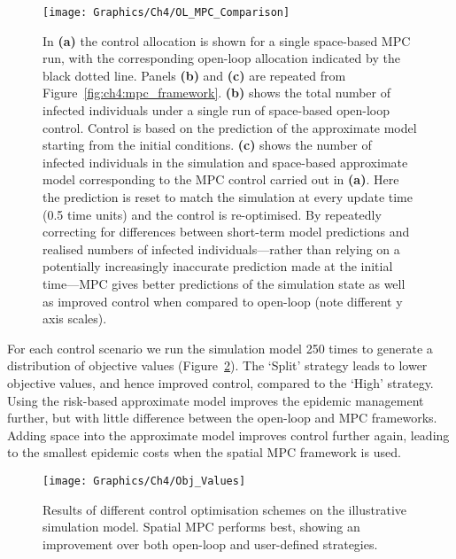 \begin{figure}[h]
    \begin{center}
        \texttt{[image: Graphics/Ch4/OL\_MPC\_Comparison]}
        \caption[Comparing open-loop and MPC optimal strategies]{In \textbf{(a)} the control allocation is shown for a single space-based MPC run, with the corresponding open-loop allocation indicated by the black dotted line. Panels \textbf{(b)} and \textbf{(c)} are repeated from Figure~\ref{fig:ch4:mpc_framework}. \textbf{(b)} shows the total number of infected individuals under a single run of space-based open-loop control. Control is based on the prediction of the approximate model starting from the initial conditions. \textbf{(c)} shows the number of infected individuals in the simulation and space-based approximate model corresponding to the MPC control carried out in \textbf{(a)}. Here the prediction is reset to match the simulation at every update time (0.5 time units) and the control is re-optimised. By repeatedly correcting for differences between short-term model predictions and realised numbers of infected individuals---rather than relying on a potentially increasingly inaccurate prediction made at the initial time---MPC gives better predictions of the simulation state as well as improved control when compared to open-loop (note different y axis scales).}
        \label{fig:ch4:ol_mpc_comparison}
    \end{center}
\end{figure}

For each control scenario we run the simulation model 250 times to generate a distribution of objective values (Figure~\ref{fig:ch4:obj_values}). The `Split' strategy leads to lower objective values, and hence improved control, compared to the `High' strategy. Using the risk-based approximate model improves the epidemic management further, but with little difference between the open-loop and MPC frameworks. Adding space into the approximate model improves control further again, leading to the smallest epidemic costs when the spatial MPC framework is used.

\begin{figure}[h]
    \begin{center}
        \texttt{[image: Graphics/Ch4/Obj\_Values]}
        \caption[Comparing control strategy performance on the network model]{Results of different control optimisation schemes on the illustrative simulation model. Spatial MPC performs best, showing an improvement over both open-loop and user-defined strategies.}
        \label{fig:ch4:obj_values}
    \end{center}
\end{figure}

